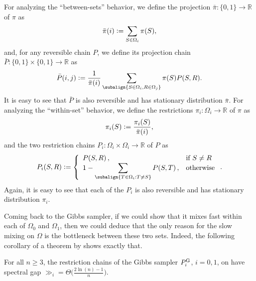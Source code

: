 For analyzing the ``between-sets'' behavior, we define the projection $\bar{\pi} : \{0, 1\} \to \mathbb{R}$ of $\pi$ as
\begin{align*}
  \bar{\pi}(i) \vcentcolon= \sum_{S \in \Omega_i} \pi(S),
\end{align*}
and, for any reversible chain $P$, we define its projection chain $\bar{P} : \{0, 1\} \times \{0, 1\} \to \mathbb{R}$ as
\begin{align*}
  \bar{P}(i, j) \defeq \frac{1}{\bar{\pi}(i)} \sum_{\subalign{S \in \Omega_i, R \in \Omega_j}} \pi(S) P(S, R).
\end{align*}
It is easy to see that $\bar{P}$ is also reversible and has stationary distribution $\bar{\pi}$. For analyzing the ``within-set'' behavior, we define the restrictions $\pi_i : \Omega_i \to \mathbb{R}$ of $\pi$ as
\begin{align*}
  \pi_i(S) \vcentcolon= \frac{\pi_i(S)}{\bar{\pi}(i)},
\end{align*}
and the two restriction chains $P_i : \Omega_i \times \Omega_i \to \mathbb{R}$ of $P$ as
\begin{align*}
  P_i(S, R) \defeq \twopartdefo{P(S, R)}{S \neq R}{1 - \displaystyle\sum_{\subalign{T \in \Omega_i: T \neq S}}P(S, T)}.
\end{align*}
Again, it is easy to see that each of the $P_i$ is also reversible and has stationary distribution $\pi_i$.

Coming back to the Gibbs sampler, if we could show that it mixes fast within each of $\Omega_0$ and $\Omega_1$, then we could deduce that the only reason for the slow mixing on $\Omega$ is the bottleneck between these two sets.
Indeed, the following corollary of a theorem by \cite{ding09} shows exactly that.
\begin{cor} \label{thm:grest}
  For all $n \geq 3$, the restriction chains of the Gibbs sampler $P^{\mathrm{G}}_i$, $i = 0, 1$, on \ising{} have spectral gap $\gg_i = \Theta\big(\displaystyle\tfrac{2\ln(n) - 1}{n}\big)$.
\end{cor}

